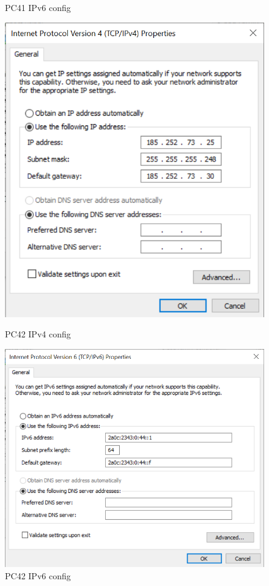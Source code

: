 \documentclass{article}
\begin{document}
\begin{figure}[!htp]
\begin{minipage}[b]{0.2\textwidth}
    \caption{PC41 IPv6 config}
  \end{minipage}
  \hspace{0.8cm}
  \begin{minipage}[b]{0.2\textwidth}
    \includegraphics[width=\textwidth]{Arbeitsergebnisse/PC42/pc42_IPv4_config.png}
    \caption{PC42 IPv4 config}
  \end{minipage}
  \hspace{0.8cm}
  \begin{minipage}[b]{0.2\textwidth}
    \includegraphics[width=\textwidth]{Arbeitsergebnisse/PC42/pc42_IPv6_config.png}
    \caption{PC42 IPv6 config}
  \end{minipage}
\end{figure}
\end{document}
